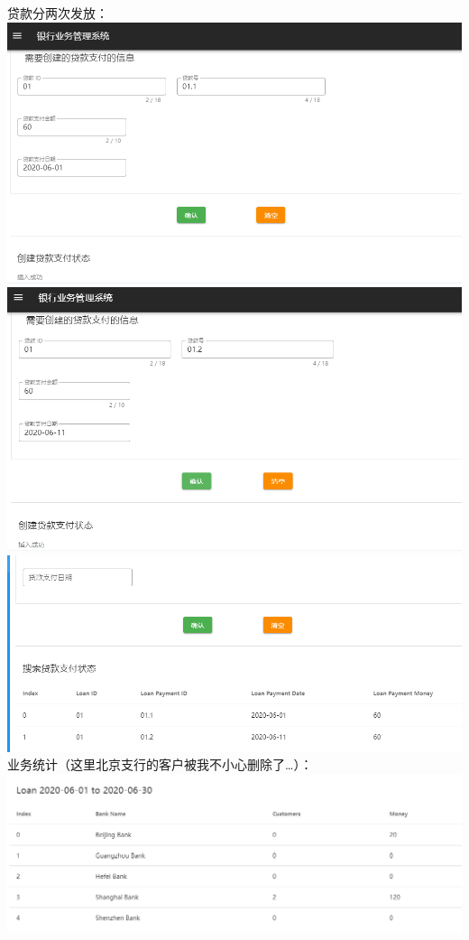 \documentclass{article}
\begin{document}
	贷款分两次发放：\\
	\includegraphics*[scale=0.4]{16.png}\\
	\includegraphics*[scale=0.4]{17.png}\\
	\includegraphics*[scale=0.4]{21.png}\\
	业务统计（这里北京支行的客户被我不小心删除了…）：\\
	\includegraphics*[scale=0.4]{22.png}\\
\end{document}

